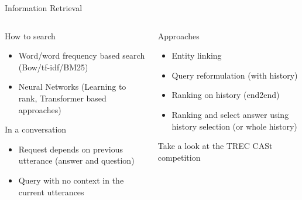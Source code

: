 \documentclass[10pt,aspectratio=169]{beamer}
\begin{document}
\begin{frame}{Information Retrieval}
    \begin{columns}
        \begin{column}{0.5\textwidth}
               \begin{block}{How to search}
            \begin{itemize}
                \item Word/word frequency based search (Bow/tf-idf/BM25)
                \item Neural Networks (Learning to rank, Transformer based approaches)
            \end{itemize}
        \end{block}
        \begin{block}{In a conversation}
            \begin{itemize}
                \item Request depends on previous utterance (answer and question)
                \item Query with no context in the current utterances
            \end{itemize}  
        \end{block} 
        \end{column}
        \begin{column}{0.5\textwidth}
            \begin{block}{Approaches}
                \begin{itemize}
                    \item Entity linking
                    \item Query reformulation (with history)
                    \item Ranking on history (end2end) \cite{nam-2023-cosplade}
                    \item Ranking and select answer using history selection (or whole history) \cite{Qu_2019}%
                \end{itemize}
            \end{block}
            Take a look at the TREC CASt competition
        \end{column}
    \end{columns}

\end{frame}
\end{document}

